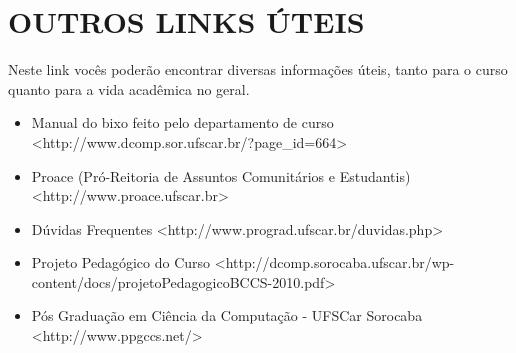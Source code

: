 \section{OUTROS LINKS ÚTEIS}
Neste link vocês poderão encontrar diversas informações úteis, tanto para o curso quanto para a vida acadêmica no geral.

\begin{itemize}
\item Manual do bixo feito pelo departamento de curso \newline <http://www.dcomp.sor.ufscar.br/?page\_id=664>

\item Proace (Pró-Reitoria de Assuntos Comunitários e Estudantis) \newline <http://www.proace.ufscar.br>

\item Dúvidas Frequentes \newline <http://www.prograd.ufscar.br/duvidas.php>

\item Projeto Pedagógico do Curso \newline <http://dcomp.sorocaba.ufscar.br/wp-content/docs/projetoPedagogicoBCCS-2010.pdf>

\item Pós Graduação em Ciência da Computação - UFSCar Sorocaba \newline <http://www.ppgccs.net/>
\end{itemize}

